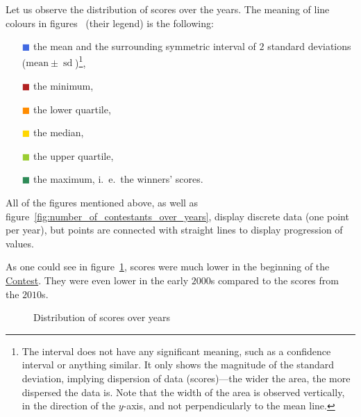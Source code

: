 \documentclass[conference, a4paper, 12pt]{IEEEtran}
\DeclareMathOperator{\sd}{\mathrm{sd}}
\begin{document}
    Let us observe the distribution of scores over the years. The meaning of line colours in figures~ (their legend) is the following:
    \begin{itemize}
        \item[\textcolor{RoyalBlue}{$ {\blacksquare} $}] the mean and the surrounding symmetric interval of $ 2 $ standard deviations ($ \text{mean} \pm {\sd} $)\footnote{The interval does not have any significant meaning, such as a confidence interval or anything similar. It only shows the magnitude of the standard deviation, implying dispersion of data (scores)---the wider the area, the more dispersed the data is. Note that the width of the area is observed vertically, in the direction of the $ y $-axis, and not perpendicularly to the mean line.},
        \item[\textcolor{FireBrick}{$ {\blacksquare} $}] the minimum,
        \item[\textcolor{DarkOrange}{$ {\blacksquare} $}] the lower quartile,
        \item[\textcolor{Gold}{$ {\blacksquare} $}] the median,
        \item[\textcolor{YellowGreen}{$ {\blacksquare} $}] the upper quartile,
        \item[\textcolor{SeaGreen}{$ {\blacksquare} $}] the maximum, i.~e.\ the winners' scores.
    \end{itemize}
    All of the figures mentioned above, as well as figure~\ref{fig:number_of_contestants_over_years}, display discrete data (one point per year), but points are connected with straight lines to display progression of values.

    \par

    As one could see in figure~\ref{fig:distribution_of_scores_over_years}, scores were much lower in the beginning of the \href{http://eurovision.tv/}{Contest}. They were even lower in the early $ 2000 $s compared to the scores from the $ 2010 $s.

    \par

    \begin{figure}[tbhp!]
        \centering
        
        \caption{Distribution of scores over years}
        \label{fig:distribution_of_scores_over_years}
    \end{figure}
\end{document}
